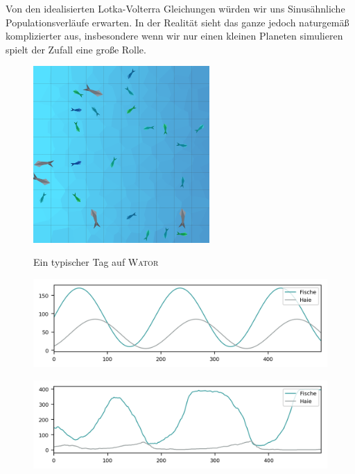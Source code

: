 \documentclass[a4paper,11pt]{article}
\newcommand{\wator}{\textsc{Wator }}
\theoremstyle{definition}
\numberwithin{equation}{section}
\begin{document}
	Von den idealisierten Lotka-Volterra Gleichungen würden wir uns Sinusähnliche Populationsverläufe erwarten. In der Realität sieht das ganze jedoch naturgemäß komplizierter aus, insbesondere wenn wir nur einen kleinen Planeten simulieren spielt der Zufall eine große Rolle. 


	\begin{figure}
		\centering
		\includegraphics[width=0.6\textwidth]{pictures/classic2.png}
		\label{fig:wator}
		\caption{Ein typischer Tag auf \wator}
	\end{figure}

	\begin{figure}
		\centering
		\includegraphics[width=\textwidth]{pictures/lotka_volterra.png}
		\label{fig:lotka_volterra}
	\end{figure}

	\begin{figure}
		\centering
		\includegraphics[width=\textwidth]{pictures/classic_default.png}
		\label{fig:classic_default}
	\end{figure}
\end{document}
